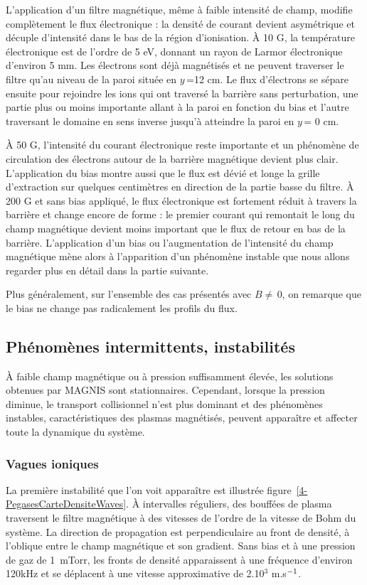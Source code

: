 \begin{refsection}
L'application d'un filtre magnétique, même à faible intensité de champ, modifie
complètement le flux électronique : la densité de courant devient asymétrique et
décuple d'intensité dans le bas de la région d'ionisation. À 10 G, la
température électronique est de l'ordre de 5 eV, donnant un rayon de Larmor
électronique d'environ 5 mm. Les électrons sont déjà magnétisés et ne peuvent
traverser le filtre qu'au niveau de la paroi située en $y\,$=12 cm. Le flux
d'électrons se sépare ensuite pour rejoindre les ions qui ont traversé la
barrière sans perturbation, une partie plus ou moins importante allant à la
paroi en fonction du bias et l'autre traversant le domaine en sens inverse
jusqu'à atteindre la paroi en $y\,$= 0 cm.

À 50 G, l'intensité du courant électronique reste importante et un phénomène de
circulation des électrons autour de la barrière magnétique devient plus clair.
L'application du bias montre aussi que le flux est dévié et longe la grille
d'extraction sur quelques centimètres en direction de la partie basse du filtre.
À 200 G et sans bias appliqué, le flux électronique est fortement réduit à travers la barrière et change encore de
forme : le premier courant qui remontait le long du champ magnétique devient
moins important que le flux de retour en bas de la barrière. L'application d'un
bias ou l'augmentation de l'intensité du champ magnétique mène alors à
l'apparition d'un phénomène instable que nous allons regarder plus en détail dans la partie suivante.

Plus généralement, sur l'ensemble des cas présentés avec $B\neq\,$0, on remarque
que le bias ne change pas radicalement les profils du flux.

\subsection{Phénomènes intermittents, instabilités}
À faible champ magnétique ou à pression suffisamment élevée, les solutions
obtenues par MAGNIS sont stationnaires.
Cependant, lorsque la pression diminue, le transport collisionnel n'est plus
dominant et des phénomènes instables, caractéristiques des plasmas
magnétisés, peuvent apparaître et affecter toute la dynamique du système. 
 
\subsubsection{Vagues ioniques}
La première instabilité que l'on voit apparaître est illustrée
figure~\ref{4-PegasesCarteDensiteWaves}. À intervalles réguliers, des bouffées
de plasma traversent le filtre magnétique à des vitesses de l'ordre de la
vitesse de Bohm du système.
La direction de propagation est perpendiculaire au front de densité, à
l'oblique entre le champ magnétique et son gradient. Sans bias et à une
pression de gaz de 1~mTorr, les fronts de densité apparaissent à une fréquence
d'environ 120kHz et se déplacent à une vitesse approximative de 2.10$^3$
m.s$^{{-1}}$.
 

\end{refsection}
